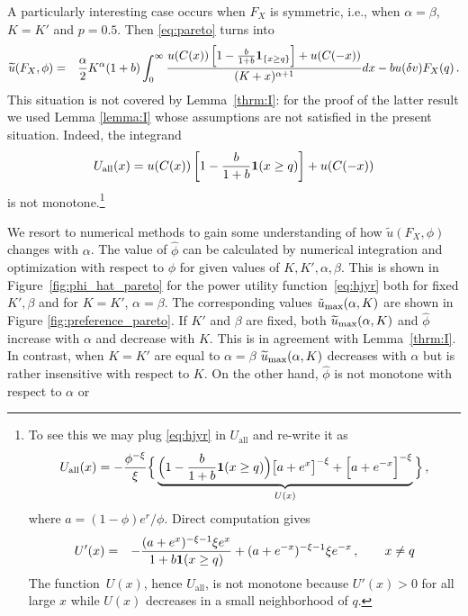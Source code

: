 \documentclass[11pt,a4]{amsart}
\newcommand{\wt}{\widetilde}
\newcommand{\fct}{function}
\newcommand{\1}{{\mathbf 1}}
\begin{document}
A particularly interesting case occurs  when 
$F_X$ is symmetric, i.e., when $\alpha = \beta$, $K =K'$ and $p=0.5$.
Then \eqref{eq:pareto} turns into 
\begin{eqnarray}
  \wt u(F_X, \phi) &=& {\alpha \over 2} K^\alpha (1 + b)
  \int_{0}^\infty {
    u(C(x)) \left[
      1 - {b \over 1 + b}\1_{\{x \ge q\}}
      \right]
    + u(C(-x))
    \over
    (K + x)^{\alpha + 1}
  } dx
  - b u(\delta v) F_X(q)\,.\nonumber\\
  \label{eq:ipf}
\end{eqnarray} 
This situation is not covered by Lemma~\ref{thrm:I}:
for the proof of the latter result we used Lemma \ref{lemma:I} whose
assumptions are not satisfied in the present situation.
Indeed, the integrand 
\[
U_{\text{all}}(x) =
u(C(x)) \left[
  1 - {b \over 1 + b}\1(x \ge q)
  \right]
+ u(C(-x))
\]
is not monotone.\footnote{To see this we may plug \eqref{eq:hjyr} 
in $U_{\text{all}}$ and re-write it as
\[U_{\text{all}}(x) =
  -{\phi^{-\xi} \over \xi} \Big\{
  \underbrace{
    \Big(1 - {b \over 1 + b}\1(x \ge q)\Big)
    \big[a + e^x\big]^{-\xi}
    +
    \Big[a + e^{-x}\Big]^{-\xi}
  }_{U(x)} \Big\}\,,
\]
where $a = (1 - \phi) e^r/\phi$.
Direct computation gives
\begin{eqnarray*}
  U'(x)
  &=&
  -{(a + e^x)^{-\xi - 1} \xi e^x
    \over
    1 + b \1(x \ge  q)
  } + (a + e^{-x})^{-\xi - 1} \xi e^{-x}\,,
  \qquad x \neq q
\end{eqnarray*} 
The \fct\ $U(x)$, hence $U_{\text{all}}$, 
is not monotone because $U'(x)>0$ for all large $x$ while $U(x)$ decreases
in a small neighborhood of $q$.}
\par
We resort to numerical methods to gain some understanding of
how $\tilde u(F_X, \phi)$ changes with $\alpha$.
The value of $\hat\phi$ can be calculated
by numerical integration and optimization with respect to $\phi$ for
given values of $K, K', \alpha, \beta$.  This is shown in 
Figure~\ref{fig:phi_hat_pareto} for the power utility \fct\
\eqref{eq:hjyr} both for fixed $K', \beta$ and for $K=K'$, $\alpha=\beta$.  
The corresponding values $\tilde u_{\rm max}(\alpha, K)$
are shown in Figure \ref{fig:preference_pareto}.
If $K'$ and $\beta$ are fixed, both $\wt u_{\rm max}(\alpha, K)$ 
and $\hat\phi$ increase  with $\alpha$ and decrease with $K$. 
This is in agreement with Lemma~\ref{thrm:I}. 
In contrast, when $K=K'$ are equal to $\alpha=\beta$
$\wt u_{\rm max}(\alpha, K)$ decreases with $\alpha$ 
but is rather insensitive with respect to $K$. On the
other hand, $\hat\phi$ is not monotone with respect to $\alpha$ or
\end{document}
